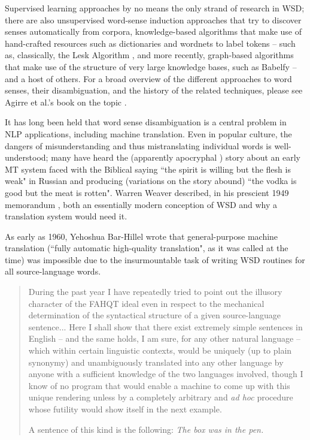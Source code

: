 Supervised learning approaches by no means the only strand of research in WSD;
there are also unsupervised word-sense induction approaches that try to
discover senses automatically from corpora, knowledge-based algorithms that
make use of hand-crafted resources such as dictionaries and wordnets to label
tokens -- such as, classically, the Lesk Algorithm \cite{lesk}, and more
recently, graph-based algorithms that make use of the structure of very large
knowledge bases, such as Babelfy \cite{moro2014entity} -- and a host of others.
For a broad overview of the different approaches to word senses, their
disambiguation, and the history of the related techniques, please see Agirre
et al.'s book on the topic \cite{agirre2006word}.

It has long been held that word sense disambiguation is a central problem in
NLP applications, including machine translation.
Even in popular culture, the dangers of misunderstanding and thus
mistranslating individual words is well-understood; many have heard the
(apparently apocryphal \cite{hutchins:whiskey}) story about an early MT system
faced with the Biblical saying ``the spirit is willing but the flesh is
weak" in Russian and producing (variations on the story abound) ``the vodka is
good but the meat is rotten".
Warren Weaver described, in his prescient 1949 memorandum \cite{weavermemo},
both an essentially modern conception of WSD and why a translation system would
need it.

As early as 1960, Yehoshua Bar-Hillel wrote that general-purpose machine
translation (``fully automatic high-quality  translation", as it was  called at
the  time) was impossible due to the insurmountable task of writing WSD
routines for all source-language words. \cite{barhillel1960}

\begin{quote}
During the past year I have repeatedly tried to point out the illusory
character of the FAHQT ideal even in respect to the mechanical determination of
the syntactical structure of a given source-language sentence... Here I shall
show that there exist extremely simple sentences in English -- and the same
holds, I am sure, for any other natural language -- which within certain
linguistic contexts, would be uniquely (up to plain synonymy) and unambiguously
translated into any other language by anyone with a sufficient knowledge of the
two languages involved, though I know of no program that would enable a machine
to come up with this unique rendering unless by a completely arbitrary and
\emph{ad hoc} procedure whose futility would show itself in the next example.

A sentence of this kind is the following: \emph{The box was in the pen.}
\end{quote}

